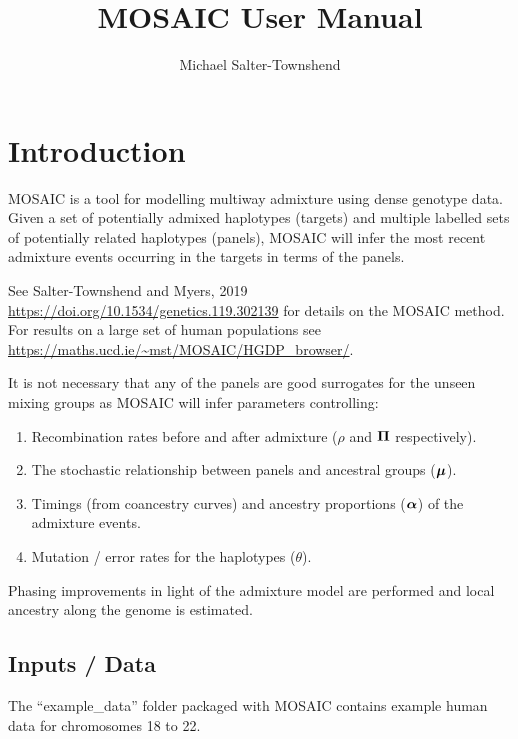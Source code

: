 \documentclass{article}
\begin{document}
\newcommand{\Fst}{\textrm{F}_{\textrm{st}}}
\newcommand{\hFst}{\hat F_{\textrm{st}}}
\newcommand{\Rst}{\textrm{R}_{\textrm{st}}}
\newcommand{\bm}[1]{\mbox{\boldmath $ #1 $}}

\title{MOSAIC User Manual}
\author{Michael Salter-Townshend}

\maketitle

\section{Introduction}
MOSAIC is a tool for modelling multiway admixture using dense genotype data. 
Given a set of potentially admixed haplotypes (targets) and multiple labelled sets of potentially related haplotypes (panels), 
MOSAIC will infer the most recent admixture events occurring in the targets in terms of the panels.

See Salter-Townshend and Myers, 2019 \url{https://doi.org/10.1534/genetics.119.302139} 
for details on the MOSAIC method. 
For results on a large set of human populations see \url{https://maths.ucd.ie/~mst/MOSAIC/HGDP_browser/}. 

It is not necessary that any of the panels are good surrogates for the unseen mixing groups as MOSAIC will infer parameters controlling:
\begin{enumerate}
  \item Recombination rates before and after admixture ($\rho$ and $\bm\Pi$ respectively). 
  \item The stochastic relationship between panels and ancestral groups ($\bm\mu$). 
  \item Timings (from coancestry curves) and ancestry proportions ($\bm\alpha$) of the admixture events.
  \item Mutation / error rates for the haplotypes ($\theta$).
\end{enumerate}

Phasing improvements in light of the admixture model are performed and local ancestry along the genome is estimated.

\subsection{Inputs / Data}
The ``example\_data'' folder packaged with MOSAIC contains example human data for chromosomes 18 to 22.
\end{document}
